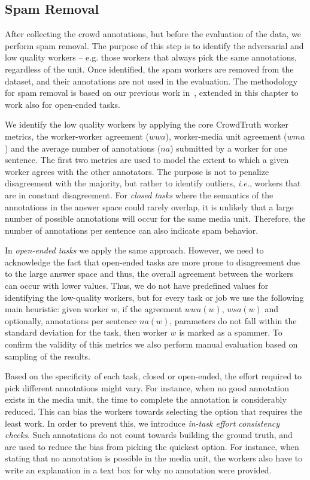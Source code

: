 \subsection{Spam Removal}
\label{subsec:spam_removal}

After collecting the crowd annotations, but before the evaluation of the data, we perform spam removal.  The purpose of this step is to identify the adversarial and low quality workers -- e.g. those workers that always pick the same annotations, regardless of the unit. Once identified, the spam workers are removed from the dataset, and their annotations are not used in the evaluation.  The methodology for spam removal is based on our previous work in~\cite{soberon2013}, extended in this chapter to work also for open-ended tasks. 

We identify the low quality workers by applying the core CrowdTruth worker metrics, the worker-worker agreement ($wwa$), worker-media unit agreement ($wma$) and the average number of annotations ($na$) submitted by a worker for one sentence. The first two metrics are used to model the extent to which a given worker agrees with the other annotators. The purpose is not to penalize disagreement with the majority, but rather to identify outliers, \emph{i.e.}, workers that are in constant disagreement. For \emph{closed tasks} where the semantics of the annotations in the answer space could rarely overlap, it is unlikely that a large number of possible annotations will occur for the same media unit. Therefore, the number of annotations per sentence can also indicate spam behavior. 

In \emph{open-ended tasks} we apply the same approach. However, we need to acknowledge the fact that open-ended tasks are more prone to disagreement due to the large answer space and thus, the overall agreement between the workers can occur with lower values. Thus, we do not have predefined values for identifying the low-quality workers, but for every task or job we use the following main heuristic: given worker $w$, if the agreement $wwa(w)$, $wsa(w)$ and optionally, annotations per sentence $na(w)$, parameters do not fall within the standard deviation for the task, then worker $w$ is marked as a spammer. To confirm the validity of this metrics we also perform manual evaluation based on sampling of the results.

Based on the specificity of each task, closed or open-ended, the effort required to pick different annotations might vary. For instance, when no good annotation exists in the media unit, the time to complete the annotation is considerably reduced. This can bias the workers towards selecting the option that requires the least work. In order to prevent this, we introduce \textit{in-task effort consistency checks}. Such annotations do not count towards building the ground truth, and are used to reduce the bias from picking the quickest option. For instance, when stating that no annotation is possible in the media unit, the workers also have to write an explanation in a text box for why no annotation were provided.

